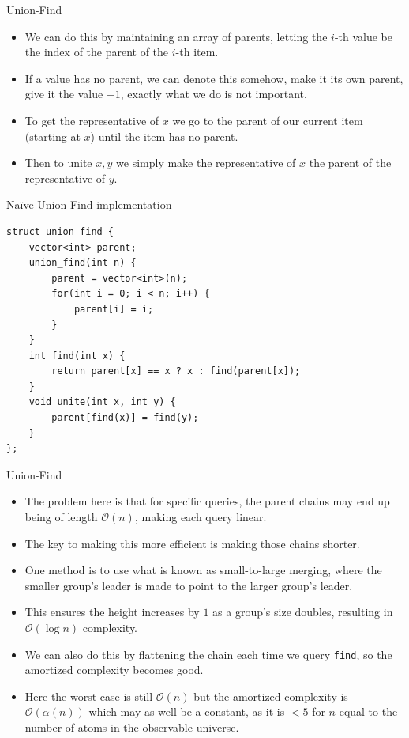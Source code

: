 \documentclass{beamer}
\begin{document}
\begin{frame}[plain]{Union-Find}
    \begin{itemize}
        \item<1-> We can do this by maintaining an array of parents, letting the $i$-th value be the index of the parent of the $i$-th item.
        \item<1-> If a value has no parent, we can denote this somehow, make it its own parent, give it the value $-1$, exactly what we do is not important.
        \item<2-> To get the representative of $x$ we go to the parent of our current item (starting at $x$) until the item has no parent.
        \item<2-> Then to unite $x, y$ we simply make the representative of $x$ the parent of the representative of $y$.
    \end{itemize}
\end{frame}

\begin{frame}{Naïve Union-Find implementation}
    \begin{verbatim}
struct union_find {
    vector<int> parent;
    union_find(int n) {
        parent = vector<int>(n);
        for(int i = 0; i < n; i++) {
            parent[i] = i;
        }
    }
    int find(int x) {
        return parent[x] == x ? x : find(parent[x]);
    }
    void unite(int x, int y) {
        parent[find(x)] = find(y);
    }
};
    \end{verbatim}
\end{frame}

\begin{frame}[plain]{Union-Find}
    \begin{itemize}
        \item<1-> The problem here is that for specific queries, the parent chains may end up being of length $\mathcal{O}(n)$, making each query linear.
        \item<1-> The key to making this more efficient is making those chains shorter.
        \item<2-> One method is to use what is known as small-to-large merging, where the smaller group's leader is made to point to the larger group's leader.
        \item<2-> This ensures the height increases by $1$ as a group's size doubles, resulting in $\mathcal{O}(\log n)$ complexity.
        \item<3-> We can also do this by flattening the chain each time we query \texttt{find}, so the amortized complexity becomes good.
        \item<3-> Here the worst case is still $\mathcal{O}(n)$ but the amortized complexity is $\mathcal{O}(\alpha(n))$ which may as well be a constant, as it is $<5$ for $n$ equal to the number of atoms in the observable universe.
    \end{itemize}
\end{frame}
\end{document}
